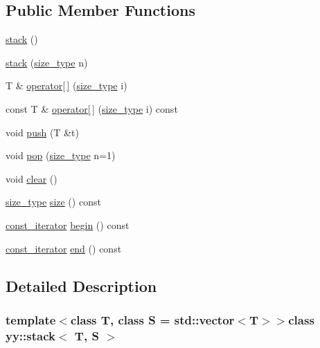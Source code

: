 \subsection*{Public Member Functions}
\begin{DoxyCompactItemize}
\item 
\hyperlink{classyy_1_1stack_a40ce1d12c5c83edbae23a0a52aaa6d97}{stack} ()
\item 
\hyperlink{classyy_1_1stack_ab800bf742c78bdab971c56b3610e59bd}{stack} (\hyperlink{classyy_1_1stack_a691214fce87b366b08f7ceb4217d6f27}{size\-\_\-type} n)
\item 
T \& \hyperlink{classyy_1_1stack_a7ba7094e58db1a3ea0e0c0446abfb1fa}{operator\mbox{[}$\,$\mbox{]}} (\hyperlink{classyy_1_1stack_a691214fce87b366b08f7ceb4217d6f27}{size\-\_\-type} i)
\item 
const T \& \hyperlink{classyy_1_1stack_ad6ff3ddf67a8d49f9259853152ff8d06}{operator\mbox{[}$\,$\mbox{]}} (\hyperlink{classyy_1_1stack_a691214fce87b366b08f7ceb4217d6f27}{size\-\_\-type} i) const 
\item 
void \hyperlink{classyy_1_1stack_acf2b971ffb94c77b56fc0249b55250fa}{push} (T \&t)
\item 
void \hyperlink{classyy_1_1stack_ad5b362aa2e2809043de625efbd77c9fb}{pop} (\hyperlink{classyy_1_1stack_a691214fce87b366b08f7ceb4217d6f27}{size\-\_\-type} n=1)
\item 
void \hyperlink{classyy_1_1stack_ae8b2c8309dcdef98210205b1c96b2238}{clear} ()
\item 
\hyperlink{classyy_1_1stack_a691214fce87b366b08f7ceb4217d6f27}{size\-\_\-type} \hyperlink{classyy_1_1stack_a5894306917b11057b00e44fbb760839e}{size} () const 
\item 
\hyperlink{classyy_1_1stack_a0cab3a74b0947ce6de68c3520b9229ab}{const\-\_\-iterator} \hyperlink{classyy_1_1stack_a3939df081955a4ad78e14eeb9b2b5dbf}{begin} () const 
\item 
\hyperlink{classyy_1_1stack_a0cab3a74b0947ce6de68c3520b9229ab}{const\-\_\-iterator} \hyperlink{classyy_1_1stack_a27ade5b933a4dc8a27960c88addda2a0}{end} () const 
\end{DoxyCompactItemize}


\subsection{Detailed Description}
\subsubsection*{template$<$class T, class S = std\-::vector$<$\-T$>$$>$class yy\-::stack$<$ T, S $>$}

